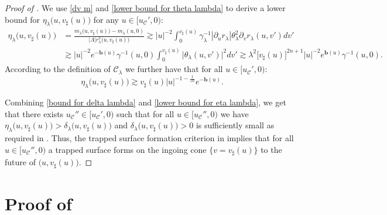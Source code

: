 \documentclass[11pt]{article}
\numberwithin{equation}{section}
\begin{document}
\begin{proof}[Proof of ]
    We use \eqref{dv m} and \eqref{lower bound for theta lambda} to derive a lower bound for $\eta_{\lambda}\big(u,v_{\sharp}(u)\big)$ for any $u\in[u_{\mathcal{C}}',0):$
    \begin{align*}
        \eta_{\lambda}\big(u,v_{\sharp}(u)\big)&=\frac{m_{\lambda}\big(u,v_{\sharp}(u)\big)-m_{\lambda}(u,0)}{|\Lambda|r_{\lambda}^2\big(u,v_{\sharp}(u)\big)}\gtrsim|u|^{-2}\int_0^{v_{\sharp}(u)}\gamma_{\lambda}^{-1}|\partial_ur_{\lambda}|\theta_{\lambda}^2\partial_vr_{\lambda}(u,v')dv'\\
        &\gtrsim|u|^{-2}e^{-\mathbf{b}(u)}\gamma^{-1}(u,0)\int_0^{v_{\sharp}(u)}\big|\theta_{\lambda}(u,v')\big|^2dv'\gtrsim\lambda^2\big[v_{\sharp}(u)\big]^{2n+1}|u|^{-2}e^{\mathbf{b}(u)}\gamma^{-1}(u,0).
    \end{align*}
    According to the definition of $\mathcal{C}_{\lambda}$ we further have that for all $u\in[u_{\mathcal{C}}',0):$
    \begin{equation}\label{lower bound for eta lambda}
        \eta_{\lambda}\big(u,v_{\sharp}(u)\big)\gtrsim v_{\sharp}(u)|u|^{-1-\frac{1}{5n}}e^{-\mathbf{b}(u)}.
    \end{equation}

    Combining \eqref{bound for delta lambda} and \eqref{lower bound for eta lambda}, we get that there exists $u_{\mathcal{C}}''\in[u_{\mathcal{C}}',0)$ such that for all $u\in[u_{\mathcal{C}}'',0)$ we have $\eta_{\lambda}\big(u,v_{\sharp}(u)\big)>\delta_{\lambda}\big(u,v_{\sharp}(u)\big)$ and $\delta_{\lambda}\big(u,v_{\sharp}(u)\big)>0$ is sufficiently small as required in . Thus, the trapped surface formation criterion in  implies that for all $u\in[u_{\mathcal{C}}'',0)$ a trapped surface forms on the ingoing cone $\big\{v=v_{\sharp}(u)\big\}$ to the future of $\big(u,v_{\sharp}(u)\big).$
\end{proof}

\section{Proof of }\label{WCC section}
\end{document}
